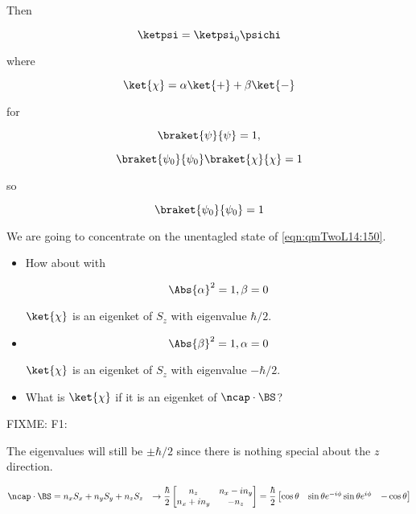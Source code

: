 Then

\begin{equation}\label{eqn:qmTwoL14:150}
\ketpsi = \ketpsi_0 \psichi
\end{equation}

where 

\begin{equation}\label{eqn:qmTwoL14:n}
\ket{\chi} = \alpha \ket{+} + \beta \ket{-}
\end{equation}

for 

\begin{equation}\label{eqn:qmTwoL14:n}
\braket{\psi}{\psi} = 1,
\end{equation}

\begin{equation}\label{eqn:qmTwoL14:n}
\braket{\psi_0}{\psi_0} 
\braket{\chi}{\chi}  = 1
\end{equation}

so

\begin{equation}\label{eqn:qmTwoL14:n}
\braket{\psi_0}{\psi_0} = 1
\end{equation}

We are going to concentrate on the unentagled state of \ref{eqn:qmTwoL14:150}.

\begin{itemize}
\item
How about with

\begin{equation}\label{eqn:qmTwoL14:n}
\Abs{\alpha}^2 = 1, \beta = 0
\end{equation}

$\ket{\chi}$ is an eigenket of $S_z$ with eigenvalue $\hbar/2$.
\item

\begin{equation}\label{eqn:qmTwoL14:n}
\Abs{\beta}^2 = 1, \alpha = 0
\end{equation}

$\ket{\chi}$ is an eigenket of $S_z$ with eigenvalue $-\hbar/2$.

\item
What is $\ket{\chi}$ if it is an eigenket of $\ncap \cdot \BS$?
\end{itemize}

FIXME: F1:

The eigenvalues will still be $\pm \hbar/2$ since there is nothing special about the $z$ direction.

\begin{align*}
\ncap \cdot \BS &= 
n_x S_x
+n_y S_y
+n_z S_z
&\rightarrow
\frac{\hbar}{2} 
\begin{bmatrix}
n_z & n_x - i n_y \\
n_x + i n_y & -n_z
\end{bmatrix}
=
\frac{\hbar}{2} 
\begin{bmatrix}
\cos\theta & \sin\theta e^{-i\phi}
\sin\theta e^{i\phi} & -\cos\theta
\end{bmatrix}
\end{align*}

